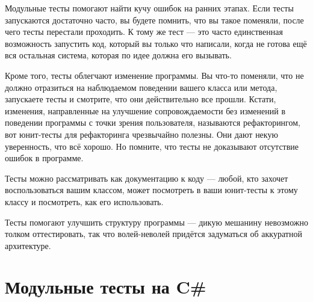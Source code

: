 \documentclass[a5paper]{article}
\begin{document}
Модульные тесты помогают найти кучу ошибок на ранних этапах. Если тесты запускаются достаточно часто, вы будете помнить, что вы такое поменяли, после чего тесты перестали проходить. К тому же тест --- это часто единственная возможность запустить код, который вы только что написали, когда не готова ещё вся остальная система, которая по идее должна его вызывать.

Кроме того, тесты облегчают изменение программы. Вы что-то поменяли, что не должно отразиться на наблюдаемом поведении вашего класса или метода, запускаете тесты и смотрите, что они действительно все прошли. Кстати, изменения, направленные на улучшение сопровождаемости без изменений в поведении программы с точки зрения пользователя, называются рефакторингом, вот юнит-тесты для рефакторинга чрезвычайно полезны. Они дают некую уверенность, что всё хорошо. Но помните, что тесты не доказывают отсутствие ошибок в программе.

Тесты можно рассматривать как документацию к коду --- любой, кто захочет воспользоваться вашим классом, может посмотреть в ваши юнит-тесты к этому классу и посмотреть, как его использовать.

Тесты помогают улучшить структуру программы --- дикую мешанину невозможно толком оттестировать, так что волей-неволей придётся задуматься об аккуратной архитектуре.

\section{Модульные тесты на C\#}
\end{document}
